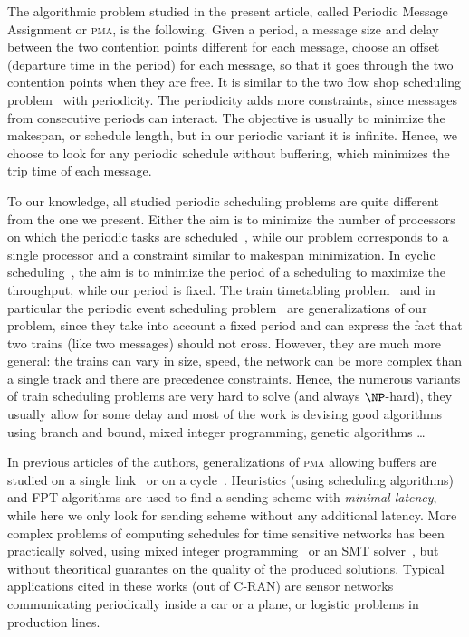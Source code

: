 \documentclass[10pt, conference, letterpaper]{IEEEtran}
\newcommand\pma{\textsc{pma}\xspace}
\begin{document}
The algorithmic problem studied in the present article, called Periodic Message Assignment or \pma, is the following.
Given a period, a message size and delay between the two contention points different for each message, choose an offset (departure time in the period) for each message, so that it goes through the two contention points when they are free. It is  similar to the two flow shop scheduling problem~\cite{yu2004minimizing} with periodicity. The periodicity adds more constraints, since messages from consecutive periods can interact. The objective is usually to minimize the makespan, or schedule length, but in our periodic variant it is infinite. Hence, we choose to look for any periodic schedule without buffering, which minimizes the trip time of each message. 


 To our knowledge, all studied periodic scheduling problems are quite different from the one we present.
Either the aim is to minimize the number of processors on which the periodic tasks are scheduled~\cite{korst1991periodic,hanen1993cyclic}, while our problem corresponds to a single processor and a constraint similar to makespan minimization. In cyclic scheduling~\cite{levner2010complexity}, the aim is to minimize the period of a scheduling to maximize the throughput, while our period is fixed. The train timetabling problem~\cite{lusby2011railway} and in particular the periodic event scheduling problem~\cite{serafini1989mathematical} are generalizations of our problem, since they take into account 
a fixed period and can express the fact that two trains (like two messages) should not cross. However, they are much more general: the trains can vary in size, speed, the network can be more complex than a single track and there are precedence constraints. Hence, the numerous variants of train scheduling problems are very hard to solve (and always $\NP$-hard), they usually allow for some delay and most of the work is devising good algorithms using branch and bound, mixed integer programming, genetic algorithms \dots~\cite{lusby2011railway}


In previous articles of the authors, generalizations of \pma allowing buffers are studied on a single link~\cite{dominique2018deterministic} or on a cycle~\cite{Guir1905:Deterministic}. Heuristics (using scheduling algorithms) and FPT algorithms are used to find a sending scheme with \emph{minimal latency}, while here we only look for sending scheme without any additional latency. More complex problems of computing schedules for time sensitive networks has been practically solved, using mixed integer programming~\cite{nayak2017incremental,steiner2018traffic} or an SMT solver~\cite{dos2019tsnsched}, but without theoritical guarantes on the quality of the produced solutions. Typical applications cited in these works (out of C-RAN) are sensor networks communicating periodically inside a car or a plane, or logistic problems in production lines.
\end{document}
